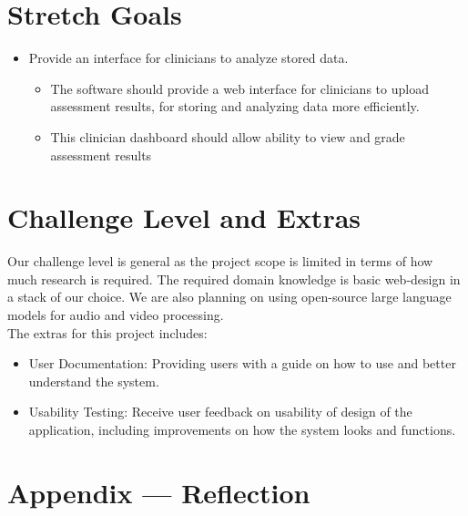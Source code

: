 \documentclass{article}
\begin{document}
\section{Stretch Goals}
\begin{itemize}
    \item Provide an interface for clinicians to analyze stored data.
    \begin{itemize}
        \item The software should provide a web interface for clinicians to upload assessment results, for storing and analyzing data more efficiently.\\
        \item This clinician dashboard should allow ability to view and grade assessment results
    \end{itemize}
\end{itemize}


\section{Challenge Level and Extras}

Our challenge level is general as the project scope is limited in terms of how much research is required. The required domain knowledge
is basic web-design in a stack of our choice. We are also planning on using open-source large language models for audio and video processing.\\
\indent The extras for this project includes:
\begin{itemize}
    \item User Documentation: Providing users with a guide on how to use and better understand the system.
    \item Usability Testing: Receive user feedback on usability of design of the application, including improvements on how the system looks and functions.
\end{itemize}

\newpage{}

\section*{Appendix --- Reflection}


\end{document}
